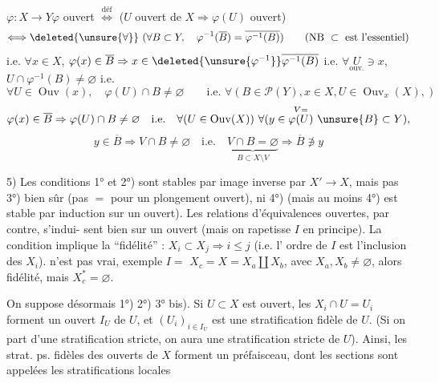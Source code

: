 $\varphi:X\longrightarrow Y$\qquad $\varphi$ ouvert $\overset{\mathrm{déf}}\Longleftrightarrow$ ($U$ ouvert de $X\Rightarrow\varphi(U)$ ouvert)
\[
\Longleftrightarrow\deleted{\unsure{\forall}}\ (\forall B\subset Y,\quad\varphi^{-1}(\overline B)=\overline{\varphi^{-1}(B)})
\qquad(\text{NB }\subset\text{ est l'essentiel})
\]
i.e. $\forall x\in X$, $\varphi(x)\in\overline B\Rightarrow x\in\deleted{\unsure{\varphi^{-1}}}\overline{\varphi^{-1}(B)}$
i.e. $\forall\underset{\mathrm{ouv.}}{U}\ni x$, $U\cap\varphi^{-1}(B)\ne\varnothing$ i.e.
\[
\forall U\in\operatorname{Ouv}(x),\quad\varphi(U)\cap B\ne\varnothing
\qquad\text{i.e. }\forall(B\in\mathcal P(Y),x\in X,U\in\operatorname{Ouv}_x(X),)
\]
\[
\varphi(x)\in\overline B\Rightarrow\varphi(U)\cap B\ne\varnothing\quad\text{i.e.}\quad
\forall(U\in\operatorname{Ouv}(X))\ \forall(y\in\overset{V=}{\varphi(U)}\ \unsure{B}\subset Y),
\]
\[
y\in\overline B\Rightarrow V\cap B\ne\varnothing\quad\text{i.e.}\quad
\underbrace{V\cap B=\varnothing}_{B\subset X\setminus V}\Rightarrow\overline B\not\ni y
\]

5) Les conditions 1° et 2°) sont stables par image inverse
par $X'\longrightarrow X$, mais pas 3°) bien sûr (pas $=$ pour
un plongement ouvert), ni 4°) (mais au moins
4°) est stable par induction sur un ouvert). Les
relations d'équivalences ouvertes, par contre, s'indui-
sent bien sur un ouvert (mais on rapetisse $I$
en principe). 
La condition 
implique la ``fidélité'' : $X_i\subset X_j\Rightarrow i\leq j$ (i.e. l'
ordre de $I$ est l'inclusion des $X_i$). 
n'est pas vrai, exemple $I=$
$X_c=X=X_a\amalg X_b$,  avec $X_a,X_b\ne\varnothing$, alors 
fidélité,  mais $X_c^*=\varnothing$.

On suppose désormais 1°) 2°) 3° bis). Si $U\subset X$
est ouvert, les  $X_i\cap U=U_i$  \inserted{$\ne\varnothing$} forment un
ouvert $I_U$ de $U$, et $(U_i)_{i\in I_U}$ est une
stratification fidèle de $U$. (Si on part d'une
stratification stricte, on aura une stratification
stricte de $U$). Ainsi, les strat. ps. fidèles des
ouverts de $X$ forment un préfaisceau, dont les
sections sont appelées les stratifications locales


